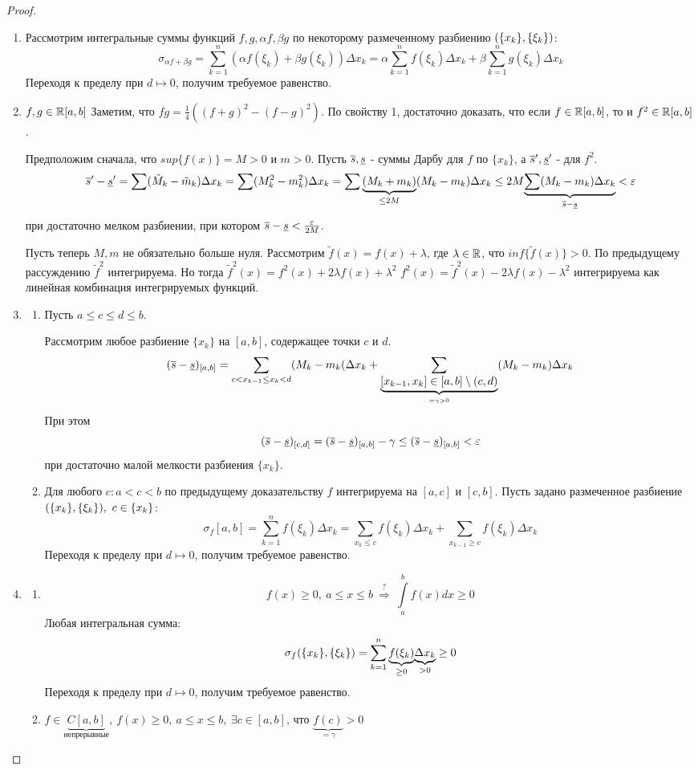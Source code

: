 \begin{proof}$\phantom{Хуй!}$
\begin{enumerate}
\item Рассмотрим интегральные суммы функций $f,g,\alpha f,\beta g$ по некоторому размеченному разбиению $(\{x_k\},\{\xi_k\})$:
$$
\sigma_{\alpha f+\beta g}=\sum\limits^n_{k=1}(\alpha f(\xi_k)+\beta g(\xi_k))\Delta x_k=\alpha\sum\limits^n_{k=1}f(\xi_k)\Delta x_k+\beta\sum\limits^n_{k=1}g(\xi_k)\Delta x_k
$$
Переходя к пределу при $d\mapsto 0$, получим требуемое равенство.
\item $f,g\in\mathbb{R}[a,b]$ Заметим, что $fg=\frac14((f+g)^2-(f-g)^2)$. По свойству 1, достаточно доказать, что если $f\in\mathbb{R}[a,b]$, то и $f^2\in\mathbb{R}[a,b]$.

Предположим сначала, что $sup\{f(x)\}=M>0$ и $m>0$. Пусть $\overline{s},\underline{s}$ - суммы Дарбу для $f$ по $\{x_k\}$, а $\overline{s}',\underline{s}'$ - для $f^2$.
$$
\overline{s}'-\underline{s}'=\sum(\tilde{M}_k-\tilde{m}_k)\Delta x_k=\sum(M^2_k-m^2_k)\Delta x_k=\sum\underset{\leq2M}{\underbrace{(M_k+m_k)}}(M_k-m_k)\Delta x_k\leq2M\underset{\overline{s}-\underline{s}}{\underbrace{\sum(M_k-m_k)\Delta x_k}}<\varepsilon
$$
при достаточно мелком разбиении, при котором $\overline{s}-\underline{s}<\frac{\varepsilon}{2M}$.

Пусть теперь $M,m$ не обязательно больше нуля. Рассмотрим $\tilde{f}(x)=f(x)+\lambda$, где $\lambda\in\mathbb{R}$, что $inf\{\tilde{f}(x)\}>0$. По предыдущему рассуждению $\tilde{f}^2$ интегрируема. Но тогда $\tilde{f}^2(x)=f^2(x)+2\lambda f(x)+\lambda^2$ \then $f^2(x)=\tilde{f}^2(x)-2\lambda f(x)-\lambda^2$ интегрируема как линейная комбинация интегрируемых функций.
\item
\begin{enumerate}
\item Пусть $a\leq c\leq d\leq b$.

Рассмотрим любое разбиение $\{x_k\}$ на $[a,b]$, содержащее точки $c$ и $d$.
$$
(\overline{s}-\underline{s})_{[a,b]}=\sum_{c<x_{k-1}\leq x_k<d}(M_k-m_k(\Delta x_k+\sum_{\underset{=\gamma>0}{\underbrace{[x_{k-1},x_k]\in[a,b]\setminus(c,d)}}}(M_k-m_k)\Delta x_k
$$
При этом
$$
(\overline{s}-\underline{s})_{[c,d]}=(\overline{s}-\underline{s})_{[a,b]}-\gamma\leq(\overline{s}-\underline{s})_{[a,b]}<\varepsilon
$$
при достаточно малой мелкости разбиения $\{x_k\}$.
\item Для любого $c\colon a<c<b$ по предыдущему доказательству $f$ интегрируема на $[a,c]$ и $[c,b]$. Пусть задано размеченное разбиение $\rr,\ c\in\{x_k\}$:
$$
\sigma_{f}[a,b]=\sum^n_{k=1}f(\xi_k)\Delta x_k=\sum_{x_k\leq c}f(\xi_k)\Delta x_k+\sum_{x_{k-1}\geq c}f(\xi_k)\Delta x_k
$$
Переходя к пределу при $d\mapsto0$, получим требуемое равенство.
\end{enumerate}
\item
\begin{enumerate}
\item
$$
f(x)\geq0,\ a\leq x\leq b\ \overset{?}{\Rightarrow}\ \int\limits^b_af(x)dx\geq0
$$
Любая интегральная сумма:
$$
\sigma_f(\{x_k\},\{\xi_k\})=\sum^n_{k=1}\underset{\geq0}{\underbrace{f(\xi_k)}}\underset{>0}{\underbrace{\Delta x_k}}\geq0
$$
Переходя к пределу при $d\mapsto0$, получим требуемое равенство.
\item $f\in \underset{\mbox{непрерывные}}{\underbrace{C[a,b]}},\ f(x)\geq0,\ a\leq x\leq b,\ \exists c\in[a,b]$, что $\underset{=\gamma}{\underbrace{f(c)}}>0$


\end{enumerate}
\end{enumerate}
\end{proof}
